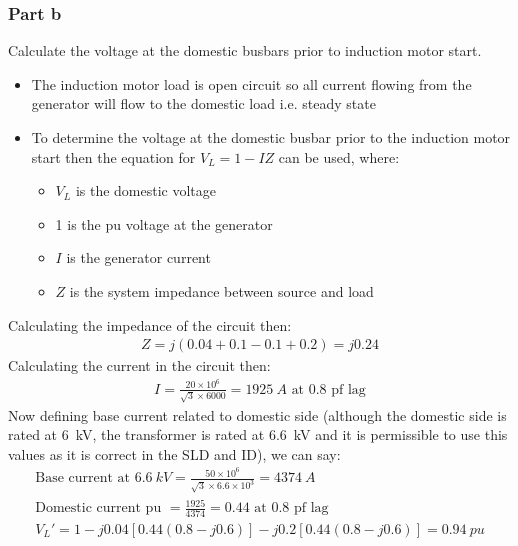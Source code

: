 \subsubsection{Part b}
Calculate the voltage at the domestic busbars prior to induction motor start.
\begin{itemize}
	\item The induction motor load is open circuit so all current flowing from the generator will flow to the domestic load i.e. steady state
	\item To determine the voltage at the domestic busbar prior to the induction motor start then the equation for $V_L = 1 - IZ$ can be used, where:
	      \begin{itemize}
		      \item $V_L$ is the domestic voltage
		      \item 1 is the pu voltage at the generator
		      \item $I$ is the generator current
		      \item $Z$ is the system impedance between source and load
	      \end{itemize}
\end{itemize}
Calculating the impedance of the circuit then:
\begin{gather}
	Z = j\left(0.04 + 0.1 - 0.1 + 0.2\right) = j0.24
\end{gather}
Calculating the current in the circuit then:
\begin{gather}
	I = \frac{20 \times 10^6}{\sqrt{3}\times 6000} = \SI{1925}{A}\textrm{ at 0.8 pf lag}
\end{gather}
Now defining base current related to domestic side (although the domestic side is rated at \SI{6}{kV}, the transformer is rated at \SI{6.6}{kV} and it is permissible to use this values as it is correct in the SLD and ID), we can say:
\begin{gather}
	\textrm{Base current at }\SI{6.6}{kV} = \frac{50\times 10^6}{\sqrt{3}\times 6.6\times 10^3} = \SI{4374}{A}\\
	\textrm{Domestic current pu } = \frac{1925}{4374} = 0.44 \textrm{ at 0.8 pf lag}\\
	V_L' = 1 - j0.04\left[0.44\left(0.8-j0.6\right)\right] - j0.2\left[0.44\left(0.8-j0.6\right)\right] = \SI{0.94}{pu}
\end{gather}
